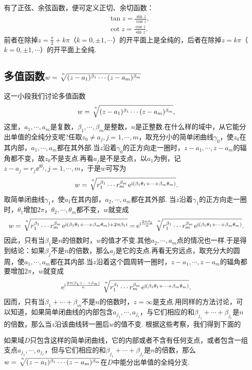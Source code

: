 有了正弦、余弦函数，便可定义正切、余切函数：
\begin{align*}
  & \tan z = \frac{\sin z}{\cos z},\\
  & \cot z = \frac{\cos z}{\sin z}.
\end{align*}
前者在除掉$z=\frac\pi2+k\pi$（$k=0,\pm1,\cdots$）的开平面上是全纯的，后者在除掉$z=k\pi$（$k=0,\pm1,\cdots$）的开平面上全纯.

\subsection{多值函数\texorpdfstring{$w=\sqrt[\leftroot{-2}\uproot{6}n]{(z-a_1)^{\beta_1}\cdots(z-a_m)^{\beta_m}}$}{}}

这一小段我们讨论多值函数
\[
  w = \sqrt[\leftroot{-2}\uproot{6} n]{(z-a_1)^{\beta_1}\cdots(z-a_m)^{\beta_m}},
\]
这里，$a_1,\cdots,a_m$是复数，$\beta_1,\cdots,\beta_m$是整数，$n$是正整数.在什么样的域中，从它能分出单值的全纯分支呢?任取$z_0\ne a_j,j=1,\cdots,m$，取充分小的简单闭曲线$\gamma_0$，使$z_0$在其内部，$a_1,\cdots,a_m$都在其外部.当$z$沿着$\gamma_0$的正方向走一圈时，$z-a_1,\cdots,z-a_m$的辐角都不变，故$z_0$不是支点.再看$a_j$是不是支点，以$a_1$为例，记$z-a_j=r_j\ee^{\ii\theta_j},j=1,\cdots,m$，于是$w$可写为
\[
  w = \sqrt[\uproot{6}\leftroot{-2} n]{r_1^{\beta_1}\cdots r_m^{\beta_m}\ee^{\ii(\beta_1\theta_1 + \cdots + \beta_m\theta_m)}}.
\]
取简单闭曲线$\gamma_1$，使$a_1$在其内部，$a_2,\cdots,a_m$都在其外部. 当$z$沿着$\gamma_1$的正方向走一圈时，$\theta_1$增加$2\pi$，$\theta_2,\cdots,\theta_m$都不变，$w$就变成
\[
  w = \sqrt[\leftroot{-2}\uproot{6}n]{r_1^{\beta_1}\cdots r_m^{\beta_m}\ee^{\ii(\beta_1\theta_1+\cdots+\beta_m\theta_m)+2\pi\beta_1\ii}}
  = \ee^{\ii\frac{2\pi\beta_1}n}\sqrt[\leftroot{-2}\uproot{6}n]{r_1^{\beta_1}\cdots r_m^{\beta_m}\ee^{\ii(\beta_1\theta_1+\cdots+\beta_m\theta_m)}}.
\]
因此，只有当$\beta_1$是$n$的倍数时，$w$的值才不变.其他$a_2,\cdots,a_m$点的情况也一样.于是得到结论：如果$\beta_j$不是$n$的倍数，那么$a_j$是它的支点.再看无穷远点，取充分大的圆周，使$a_1,\cdots,a_m$都在其内部.当$z$沿着这个圆周转一圈时，$z-a_1,\cdots,z-a_m$的辐角都要增加$2\pi$，$w$就变成
\[
  \ee^{\ii\frac{2\pi(\beta_1+\cdots+\beta_m)}n}\sqrt[\leftroot{-2}\uproot{6}n]{r_1^{\beta_1}\cdots r_m^{\beta_m}\ee^{\ii(\beta_1\theta_1+\cdots+\beta_m\theta_m)}}.
\]
因而，只有当$\beta_1+\cdots+\beta_m$不是$n$的倍数时，$z=\infty$是支点.用同样的方法讨论，可以知道，如果简单闭曲线的内部包含$a_{j_1},\cdots,a_{j_r}$，与它们相应的和$\beta_{j_1}+\cdots+\beta_{j_r}$是$n$的倍数，那么当$z$沿该曲线转一圈后$w$的值不变. 根据这些考察，我们得到下面的
\begin{theorem}\label{thm2.4.7}
  如果域$D$只包含这样的简单闭曲线，它的内部或者不含有任何支点，或者包含一组支点$a_{j_1},\cdots,a_{j_r}$，但与它们相应的和$\beta_ {j_1}+\cdots+\beta_{j_r}$是$n$的倍数，那么$w=\sqrt[\leftroot{-2}\uproot{6} n]{(z-a_1)^{\beta_1}\cdots(z-a_m)^{\beta_m}}$在$D$中能分出单值的全纯分支.
\end{theorem}

